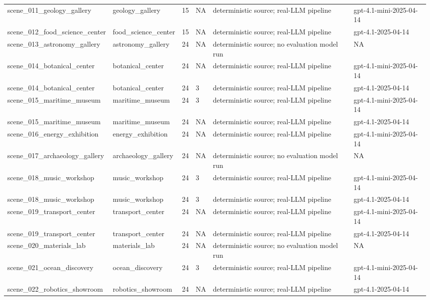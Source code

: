 \begin{tabular}{llllll}
scene\_011\_geology\_gallery & geology\_gallery & 15 & NA & deterministic source; real-LLM pipeline & gpt-4.1-mini-2025-04-14 \\
scene\_012\_food\_science\_center & food\_science\_center & 15 & NA & deterministic source; real-LLM pipeline & gpt-4.1-2025-04-14 \\
scene\_013\_astronomy\_gallery & astronomy\_gallery & 24 & NA & deterministic source; no evaluation model run & NA \\
scene\_014\_botanical\_center & botanical\_center & 24 & NA & deterministic source; real-LLM pipeline & gpt-4.1-mini-2025-04-14 \\
scene\_014\_botanical\_center & botanical\_center & 24 & 3 & deterministic source; real-LLM pipeline & gpt-4.1-2025-04-14 \\
scene\_015\_maritime\_museum & maritime\_museum & 24 & 3 & deterministic source; real-LLM pipeline & gpt-4.1-mini-2025-04-14 \\
scene\_015\_maritime\_museum & maritime\_museum & 24 & NA & deterministic source; real-LLM pipeline & gpt-4.1-2025-04-14 \\
scene\_016\_energy\_exhibition & energy\_exhibition & 24 & NA & deterministic source; real-LLM pipeline & gpt-4.1-mini-2025-04-14 \\
scene\_017\_archaeology\_gallery & archaeology\_gallery & 24 & NA & deterministic source; no evaluation model run & NA \\
scene\_018\_music\_workshop & music\_workshop & 24 & 3 & deterministic source; real-LLM pipeline & gpt-4.1-mini-2025-04-14 \\
scene\_018\_music\_workshop & music\_workshop & 24 & 3 & deterministic source; real-LLM pipeline & gpt-4.1-2025-04-14 \\
scene\_019\_transport\_center & transport\_center & 24 & NA & deterministic source; real-LLM pipeline & gpt-4.1-mini-2025-04-14 \\
scene\_019\_transport\_center & transport\_center & 24 & NA & deterministic source; real-LLM pipeline & gpt-4.1-2025-04-14 \\
scene\_020\_materials\_lab & materials\_lab & 24 & NA & deterministic source; no evaluation model run & NA \\
scene\_021\_ocean\_discovery & ocean\_discovery & 24 & 3 & deterministic source; real-LLM pipeline & gpt-4.1-mini-2025-04-14 \\
scene\_022\_robotics\_showroom & robotics\_showroom & 24 & NA & deterministic source; real-LLM pipeline & gpt-4.1-2025-04-14 \\

\end{tabular}
